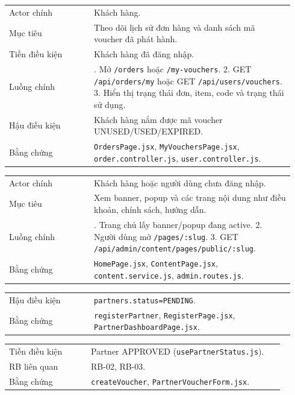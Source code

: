 \begin{longtable}{>{\raggedright\arraybackslash}p{0.28\linewidth}>{\raggedright\arraybackslash}p{0.66\linewidth}}
Actor chính & Khách hàng.\\
Mục tiêu & Theo dõi lịch sử đơn hàng và danh sách mã voucher đã phát hành.\\
Tiền điều kiện & Khách hàng đã đăng nhập.\\
Luồng chính & 1. Mở \texttt{/orders} hoặc \texttt{/my-vouchers}. 2. GET \texttt{/api/orders/my} hoặc GET \texttt{/api/users/vouchers}. 3. Hiển thị trạng thái đơn, item, code và trạng thái sử dụng.\\
Hậu điều kiện & Khách hàng nắm được mã voucher UNUSED/USED/EXPIRED.\\
Bằng chứng & \texttt{OrdersPage.jsx}, \texttt{MyVouchersPage.jsx}, \texttt{order.controller.js}, \texttt{user.controller.js}.\\
\end{longtable}

\begin{longtable}{>{\raggedright\arraybackslash}p{0.28\linewidth}>{\raggedright\arraybackslash}p{0.66\linewidth}}
Actor chính & Khách hàng hoặc người dùng chưa đăng nhập.\\
Mục tiêu & Xem banner, popup và các trang nội dung như điều khoản, chính sách, hướng dẫn.\\
Luồng chính & 1. Trang chủ lấy banner/popup đang active. 2. Người dùng mở \texttt{/pages/:slug}. 3. GET \texttt{/api/admin/content/pages/public/:slug}.\\
Bằng chứng & \texttt{HomePage.jsx}, \texttt{ContentPage.jsx}, \texttt{content.service.js}, \texttt{admin.routes.js}.\\
\end{longtable}

\begin{longtable}{>{\raggedright\arraybackslash}p{0.28\linewidth}>{\raggedright\arraybackslash}p{0.66\linewidth}}
Hậu điều kiện & \texttt{partners.status=PENDING}.\\
Bằng chứng & \texttt{registerPartner}, \texttt{RegisterPage.jsx}, \texttt{PartnerDashboardPage.jsx}.\\
\end{longtable}

\begin{longtable}{>{\raggedright\arraybackslash}p{0.28\linewidth}>{\raggedright\arraybackslash}p{0.66\linewidth}}
Tiền điều kiện & Partner APPROVED (\texttt{usePartnerStatus.js}).\\
RB liên quan & RB-02, RB-03.\\
Bằng chứng & \texttt{createVoucher}, \texttt{PartnerVoucherForm.jsx}.\\
\end{longtable}


